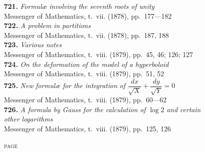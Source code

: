 \documentclass[12pt,a4paper,oneside]{book}
\begin{document}
\textbf{721.} \textit{Formul\ae{} involving the seventh roots of unity} \\
\hspace*{2em}Messenger of Mathematics, t.~vii. (1878), pp.~177---182\\[0.4em]
\textbf{722.} \textit{A problem in partitions} \\
\hspace*{2em}Messenger of Mathematics, t.~vii. (1878), pp.~187, 188\\[0.4em]
\textbf{723.} \textit{Various notes} \\
\hspace*{2em}Messenger of Mathematics, t.~viii. (1879), pp.~45, 46; 126; 127\\[0.4em]
\textbf{724.} \textit{On the deformation of the model of a hyperboloid} \\
\hspace*{2em}Messenger of Mathematics, t.~viii. (1879), pp.~51, 52\\[0.4em]
\textbf{725.} \textit{New formul\ae{} for the integration of $\dfrac{dx}{\sqrt{X}}+\dfrac{dy}{\sqrt{Y}}=0$} \\
\hspace*{2em}Messenger of Mathematics, t.~viii. (1879), pp.~60---62\\[0.4em]
\textbf{726.} \textit{A formula by Gauss for the calculation of $\log 2$ and certain}\\
\hspace*{2em}\textit{other logarithms} \\
\hspace*{2em}Messenger of Mathematics, t.~viii. (1879), pp.~125, 126

\clearpage

\vspace*{1em}

\hfill\textsc{page}
\end{document}
